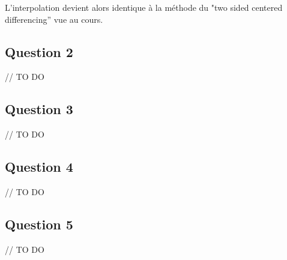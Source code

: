 L'interpolation devient alors identique à la méthode du "two sided centered differencing'' vue au cours.

\subsection{Question 2}

// TO DO

\subsection{Question 3}

// TO DO

\subsection{Question 4}

// TO DO

\subsection{Question 5}

// TO DO